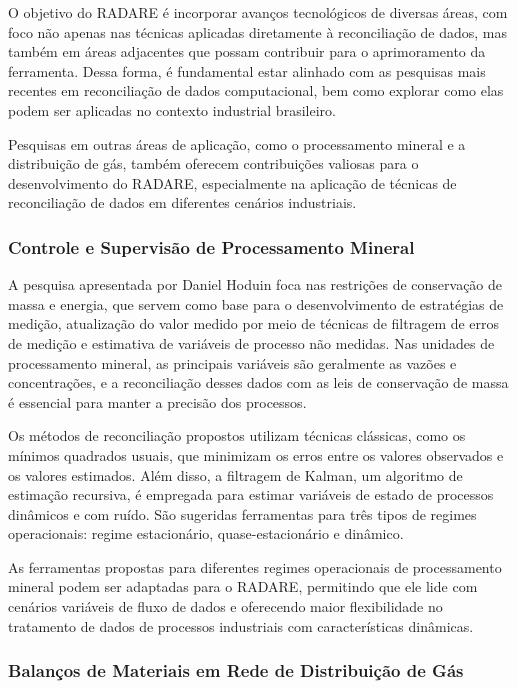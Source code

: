 O objetivo do RADARE é incorporar avanços tecnológicos de diversas áreas, com foco não apenas nas técnicas aplicadas diretamente à reconciliação de dados, mas também em áreas adjacentes que possam contribuir para o aprimoramento da ferramenta. Dessa forma, é fundamental estar alinhado com as pesquisas mais recentes em reconciliação de dados computacional, bem como explorar como elas podem ser aplicadas no contexto industrial brasileiro.

Pesquisas em outras áreas de aplicação, como o processamento mineral e a distribuição de gás, também oferecem contribuições valiosas para o desenvolvimento do RADARE, especialmente na aplicação de técnicas de reconciliação de dados em diferentes cenários industriais.

\subsubsection{Controle e Supervisão de Processamento Mineral}

A pesquisa apresentada por Daniel Hoduin \cite{danielhoduin} foca nas restrições de conservação de massa e energia, que servem como base para o desenvolvimento de estratégias de medição, atualização do valor medido por meio de técnicas de filtragem de erros de medição e estimativa de variáveis de processo não medidas. Nas unidades de processamento mineral, as principais variáveis são geralmente as vazões e concentrações, e a reconciliação desses dados com as leis de conservação de massa é essencial para manter a precisão dos processos.

Os métodos de reconciliação propostos utilizam técnicas clássicas, como os mínimos quadrados usuais, que minimizam os erros entre os valores observados e os valores estimados. Além disso, a filtragem de Kalman, um algoritmo de estimação recursiva, é empregada para estimar variáveis de estado de processos dinâmicos e com ruído. São sugeridas ferramentas para três tipos de regimes operacionais: regime estacionário, quase-estacionário e dinâmico.

As ferramentas propostas para diferentes regimes operacionais de processamento mineral podem ser adaptadas para o RADARE, permitindo que ele lide com cenários variáveis de fluxo de dados e oferecendo maior flexibilidade no tratamento de dados de processos industriais com características dinâmicas.

\subsubsection{Balanços de Materiais em Rede de Distribuição de Gás}

